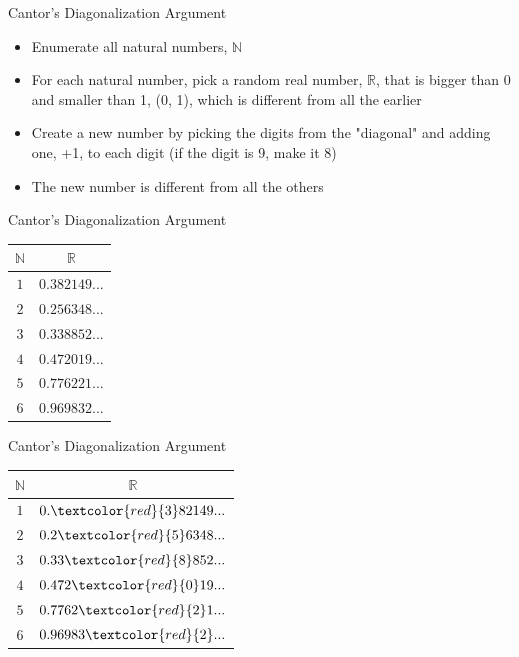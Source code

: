 \documentclass[utf8]{beamer}
\begin{document}
\begin{frame}{Cantor's Diagonalization Argument}
\begin{itemize}
\item Enumerate all natural numbers, $\mathbb{N}$
\item For each natural number, pick a random real number, $\mathbb{R}$, that is bigger than 0 and smaller than 1, (0,
1), which is different from all the earlier
\item Create a new number by picking the digits from the "diagonal" and adding one, +1, to each digit (if the digit is
9, make it 8)
\item The new number is different from all the others
\end{itemize}
\end{frame}

\begin{frame}{Cantor's Diagonalization Argument}
\begin{center}
\begin{tabular}{| c | c |}
\hline
$\mathbb{N}$ & $\mathbb{R}$ \\
\hline
$1$ & $0.382149...$ \\
\hline
$2$ & $0.256348...$ \\
\hline
$3$ & $0.338852...$ \\
\hline
$4$ & $0.472019...$ \\
\hline
$5$ & $0.776221...$ \\
\hline
$6$ & $0.969832...$ \\
\hline
\end{tabular}
\end{center}
\end{frame}

\begin{frame}{Cantor's Diagonalization Argument}
\begin{center}
\begin{tabular}{| c | c |}
\hline
$\mathbb{N}$ & $\mathbb{R}$ \\
\hline
$1$ & $0.\textcolor{red}{3}82149...$ \\
\hline
$2$ & $0.2\textcolor{red}{5}6348...$ \\
\hline
$3$ & $0.33\textcolor{red}{8}852...$ \\
\hline
$4$ & $0.472\textcolor{red}{0}19...$ \\
\hline
$5$ & $0.7762\textcolor{red}{2}1...$ \\
\hline
$6$ & $0.96983\textcolor{red}{2}...$ \\
\hline
\end{tabular}
\end{center}
\end{frame}
\end{document}
